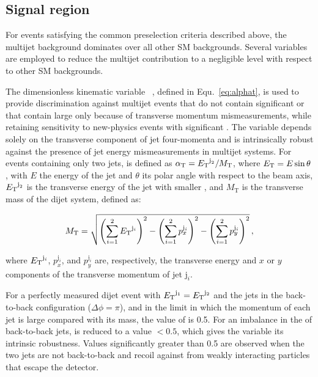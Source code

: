 \subsection{Signal region}
\label{sec:signal_region} 

For events satisfying the common preselection criteria described
above, the multijet background dominates over all other SM
backgrounds. Several variables are employed to reduce the multijet
contribution to a negligible level with respect to other SM
backgrounds.

The dimensionless kinematic variable \alphat~\cite{Randall:2008rw,
  RA1Paper}, defined in Equ.~\ref{eq:alphat}, is used to provide
discrimination against multijet events that do not contain significant
\ptvecmiss or that contain large \ptvecmiss only because of transverse
momentum mismeasurements, while retaining sensitivity to new-physics
events with significant \ptvecmiss. The \alphat variable depends
solely on the transverse component of jet four-momenta
and is intrinsically robust against the presence of jet energy
mismeasurements in multijet systems. For events containing only two
jets, \alphat is defined as $\alphat = \Et^{\text j_2}/M_\text{T}$,
where $\Et = E\sin\theta$, with $E$ the energy of the jet and $\theta$
its polar angle with respect to the beam axis, $\Et^{\text j_2}$ is
the transverse energy of the jet with smaller \Et, and $M_\text{T}$ is
the transverse mass of the dijet system, defined as:

\begin{equation}
  \label{eq:mt}
  M_\text{T} = \sqrt{ \left( \sum_{i=1}^2 \Et^{\mathrm{j}_i}
    \right)^2 - \left( \sum_{i=1}^2 p_x^{\mathrm{j}_i} \right)^2 - \left(
      \sum_{i=1}^2 p_y^{\mathrm{j}_i} \right)^2}\, ,
\end{equation}

where $\Et^{\mathrm{j}_i}$, $p_x^{\mathrm{j}_i}$, and
$p_y^{\mathrm{j}_i}$ are, respectively, the transverse energy and $x$
or $y$ components of the transverse momentum of jet $\mathrm{j}_i$.

For a perfectly measured dijet event with $\Et^{\mathrm{j}_1} =
\Et^{\mathrm{j}_2}$ and the jets in the back-to-back configuration
($\Delta\phi = \pi$), and in the limit in which the momentum of each
jet is large compared with its mass, the value of \alphat is 0.5. For
an imbalance in the \Et of back-to-back jets, \alphat is reduced to a
value $<0.5$, which gives the variable its intrinsic
robustness. Values significantly greater than 0.5 are observed when
the two jets are not back-to-back and recoil against \ptvecmiss from
weakly interacting particles that escape the detector.

